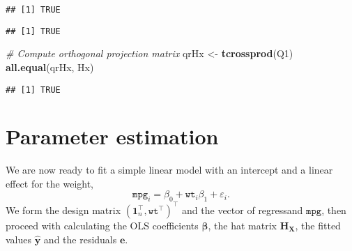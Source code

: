 \documentclass[]{book}
\newenvironment{Shaded}{\begin{snugshade}}{\end{snugshade}}
\newcommand{\KeywordTok}[1]{\textcolor[rgb]{0.13,0.29,0.53}{\textbf{#1}}}
\newcommand{\DataTypeTok}[1]{\textcolor[rgb]{0.13,0.29,0.53}{#1}}
\newcommand{\StringTok}[1]{\textcolor[rgb]{0.31,0.60,0.02}{#1}}
\newcommand{\CommentTok}[1]{\textcolor[rgb]{0.56,0.35,0.01}{\textit{#1}}}
\newcommand{\OtherTok}[1]{\textcolor[rgb]{0.56,0.35,0.01}{#1}}
\newcommand{\OperatorTok}[1]{\textcolor[rgb]{0.81,0.36,0.00}{\textbf{#1}}}
\newcommand{\NormalTok}[1]{#1}
\theoremstyle{definition}
\theoremstyle{definition}
\theoremstyle{definition}
\theoremstyle{remark}
\begin{document}
\begin{verbatim}
## [1] TRUE
\end{verbatim}

\begin{Shaded}
\end{Shaded}

\begin{verbatim}
## [1] TRUE
\end{verbatim}

\begin{Shaded}
\begin{Highlighting}[]
\CommentTok{# Compute orthogonal projection matrix}
\NormalTok{qrHx <-}\StringTok{ }\KeywordTok{tcrossprod}\NormalTok{(Q1)}
\KeywordTok{all.equal}\NormalTok{(qrHx, Hx)}
\end{Highlighting}
\end{Shaded}

\begin{verbatim}
## [1] TRUE
\end{verbatim}

\section{Parameter estimation}\label{parameter-estimation}

We are now ready to fit a simple linear model with an intercept and a
linear effect for the weight,
\[ \texttt{mpg}_i = \beta_0 + \texttt{wt}_i\beta_1 +\varepsilon_i.\] We
form the design matrix
\((\boldsymbol{1}_n^\top, \texttt{wt}^\top)^\top\) and the vector of
regressand \(\texttt{mpg}\), then proceed with calculating the OLS
coefficients \(\hat{\boldsymbol{\beta}}\), the hat matrix
\(\mathbf{H}_{\mathbf{X}}\), the fitted values \(\hat{\boldsymbol{y}}\)
and the residuals \(\boldsymbol{e}\).
\end{document}
